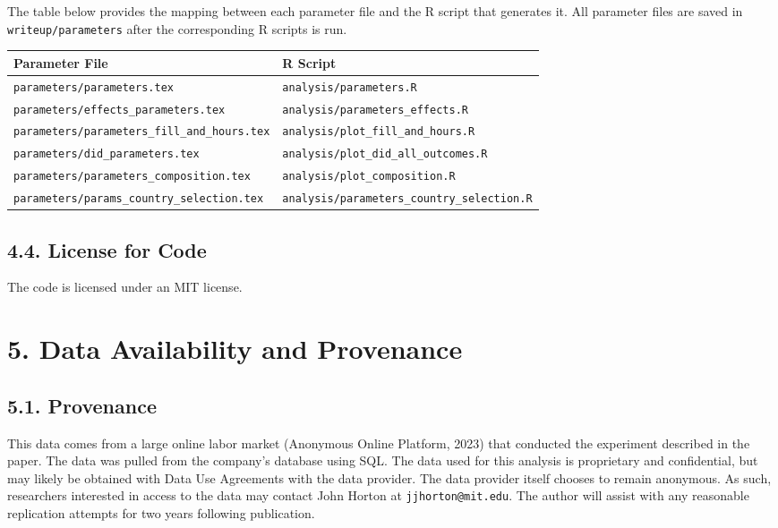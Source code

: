 \documentclass[10pt]{article}
\newenvironment{eightpt}{\begingroup\fontsize{8}{13}\selectfont}{\endgroup}
\begin{document}
The table below provides the mapping between each parameter file and the R script that generates it. 
All parameter files are saved in \texttt{writeup/parameters} after the corresponding R scripts is run.

\begin{eightpt}
\begin{tabularx}{\textwidth}{@{}LL@{}}
\toprule
Parameter File & R Script \\
\midrule
\texttt{parameters/parameters.tex} & \texttt{analysis/parameters.R} \\
\texttt{parameters/effects\_parameters.tex} & \texttt{analysis/parameters\_effects.R} \\
\texttt{parameters/parameters\_fill\_and\_hours.tex} & \texttt{analysis/plot\_fill\_and\_hours.R} \\
\texttt{parameters/did\_parameters.tex} & \texttt{analysis/plot\_did\_all\_outcomes.R} \\
\texttt{parameters/parameters\_composition.tex} & \texttt{analysis/plot\_composition.R} \\
\texttt{parameters/params\_country\_selection.tex} & \texttt{analysis/parameters\_country\_selection.R} \\
\bottomrule
\end{tabularx}
\end{eightpt}

\subsection*{4.4. License for Code}

The code is licensed under an MIT license.

\vspace{1em}
\section*{5. Data Availability and Provenance}

\subsection*{5.1. Provenance}

This data comes from a large online labor market (Anonymous Online Platform, 2023) that conducted the experiment described in the paper. 
The data was pulled from the company's database using SQL. 
The data used for this analysis is proprietary and confidential, but may likely be obtained with Data Use Agreements with the data provider.
The data provider itself chooses to remain anonymous.
As such, researchers interested in access to the data may contact John Horton at \texttt{jjhorton@mit.edu}. 
The author will assist with any reasonable replication attempts for two years following publication.
\end{document}
